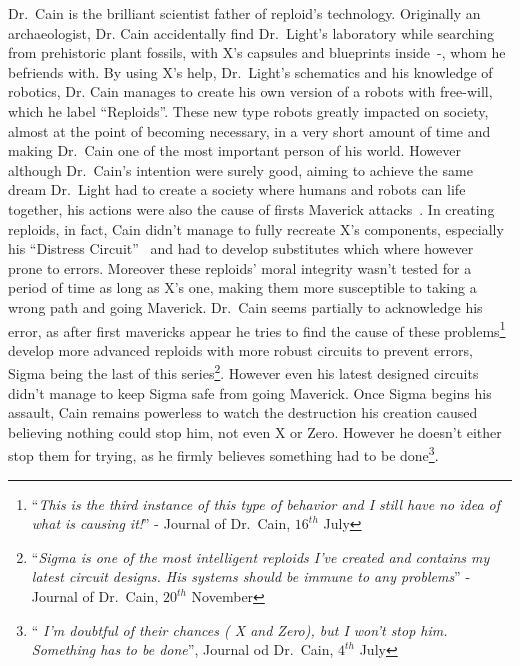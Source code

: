 Dr.~Cain is the brilliant scientist father of reploid's technology. Originally an archaeologist, Dr. Cain accidentally find Dr.~Light's laboratory while searching from prehistoric plant fossils, with X's capsules and blueprints inside~\cite{wiki:Cain_journal}-\cite{elysium_Cain_journal}, whom he befriends with. By using X's help, Dr.~Light's schematics and his knowledge of robotics, Dr. Cain manages to create his own version of a robots with free-will, which he label ``Reploids''. These new type robots greatly impacted on society, almost at the point of becoming necessary, in a very short amount of time and making Dr.~Cain one of the most important person of his world. However although Dr.~Cain's intention were surely good, aiming to achieve the same dream Dr.~Light had to create a society where humans and robots can life together, his actions were also the cause of firsts Maverick attacks~\cite{book:MH_field_guide}. In creating reploids, in fact, Cain didn't manage to fully recreate X's components, especially his ``Distress Circuit''~\cite{book:RMZ_Complete_works} and had to develop substitutes which where however prone to errors. Moreover these reploids' moral integrity wasn't tested for a period of time as long as X's one, making them more susceptible to taking a wrong path and going Maverick. Dr.~Cain seems partially to acknowledge his error, as after first mavericks appear he tries to find the cause of these problems\footnote{``\textit{This is the third instance of this type of behavior and I still have no idea of what is causing it!}'' - Journal of Dr.~Cain, $16^{th}$ July} develop more advanced reploids with more robust circuits to prevent errors, Sigma being the last of this series\footnote{``\textit{Sigma is one of the most intelligent reploids I've created and contains my latest circuit designs. His systems should be immune to any problems}'' - Journal of Dr.~Cain, $20^{th}$ November}. However even his latest designed circuits didn't manage to keep Sigma safe from going Maverick. Once Sigma begins his assault, Cain remains powerless to watch the destruction his creation caused believing nothing could stop him, not even X or Zero. However he doesn't either stop them for trying, as  he firmly believes something had to be done\footnote{``\textit{ I'm doubtful of their chances ( X and Zero), but I won't stop him. Something has to be done}'', Journal od Dr.~Cain, $4^{th}$ July}.

